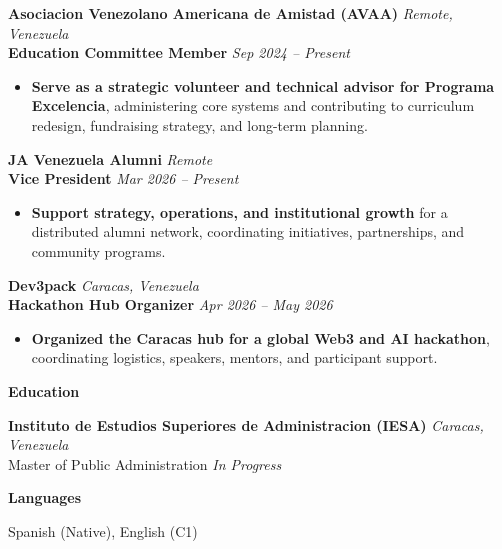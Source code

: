 \documentclass[11pt]{article}
\begin{document}
\textbf{Asociacion Venezolano Americana de Amistad (AVAA)} \hfill \textit{Remote, Venezuela} \\
\textbf{Education Committee Member} \hfill \textit{Sep 2024 -- Present}
\begin{itemize}
    \item \textbf{Serve as a strategic volunteer and technical advisor for Programa Excelencia}, administering core systems and contributing to curriculum redesign, fundraising strategy, and long-term planning.
\end{itemize}

\vspace{6pt}
\textbf{JA Venezuela Alumni} \hfill \textit{Remote} \\
\textbf{Vice President} \hfill \textit{Mar 2026 -- Present}
\begin{itemize}
    \item \textbf{Support strategy, operations, and institutional growth} for a distributed alumni network, coordinating initiatives, partnerships, and community programs.
\end{itemize}

\vspace{6pt}
\textbf{Dev3pack} \hfill \textit{Caracas, Venezuela} \\
\textbf{Hackathon Hub Organizer} \hfill \textit{Apr 2026 -- May 2026}
\begin{itemize}
    \item \textbf{Organized the Caracas hub for a global Web3 and AI hackathon}, coordinating logistics, speakers, mentors, and participant support.
\end{itemize}

\vspace{6pt}
\begin{center}
    \textbf{Education}
\end{center}
\vspace{-4pt}
\textbf{Instituto de Estudios Superiores de Administracion (IESA)} \hfill \textit{Caracas, Venezuela} \\
Master of Public Administration \hfill \textit{In Progress}

\vspace{6pt}
\begin{center}
    \textbf{Languages}
\end{center}
\vspace{-4pt}
Spanish (Native), English (C1)
\end{document}
